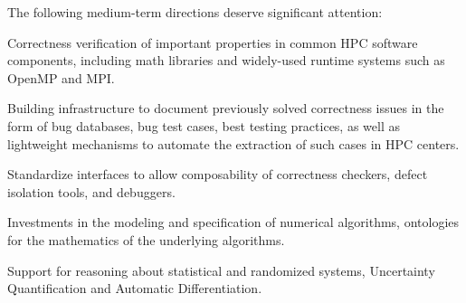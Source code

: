 \noindent The following medium-term directions deserve significant attention:

\begin{compactitem}
\item Correctness verification of important properties in common HPC software components,
including math libraries and widely-used runtime systems such as OpenMP and MPI.

\item Building infrastructure to document previously solved correctness issues in 
the form of bug databases, bug test cases, best testing practices, as well as lightweight 
mechanisms to automate the extraction of such cases in HPC centers.

\item Standardize interfaces to allow composability of correctness checkers, 
defect isolation tools, and debuggers.

\item Investments in the modeling and specification of numerical algorithms,
ontologies for the mathematics of the underlying algorithms.

\item Support for reasoning about statistical and randomized systems,
Uncertainty Quantification and Automatic Differentiation.

\end{compactitem}